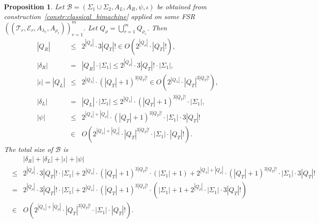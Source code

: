\documentclass{article}
\newtheorem{proposition}[definition]{Proposition}
\newcommand{\len}[1]{\ensuremath{\left| #1 \right|}}
\begin{document}
	\begin{proposition} \label{prop:size_classical_bimachine}
		Let $\mathcal{B} = (\Sigma_1\cup\Sigma_2, A_L, A_R, \psi, \iota)$ be obtained from construction~\ref{constr:classical_bimachine} applied on some FSR $((\mathcal{T}_r, \mathcal{E}_r, A_{\lambda_r}, A_{\rho_r}))_{r=1}^m$. Let $Q_\rho = \bigcup_{r=1}^m Q_{\rho_r}$. Then
		\begin{eqnarray*}
			\len{Q_R} &\le& 2^{\len{Q_\rho}}\cdot 3\len{Q_T}!\in O(2^{\len{Q_\rho}}\cdot \len{Q_T}!), \\
			\len{\delta_R} &=& \len{Q_R}\cdot \len{\Sigma_1} \le 2^{\len{Q_\rho}}\cdot 3\len{Q_T}!\cdot \len{\Sigma_1}, \\
			\len{\iota} = \len{Q_L} &\le& 2^{\len{Q_\lambda}}\cdot (\len{Q_T}+1)^{3\len{Q_T}!} \in O(2^{\len{Q_\lambda}}\cdot \len{Q_T}^{3\len{Q_T}!}), \\
			\len{\delta_L} &=& \len{Q_L}\cdot \len{\Sigma_1} \le 2^{\len{Q_\lambda}}\cdot (\len{Q_T}+1)^{3\len{Q_T}!}\cdot \len{\Sigma_1}, \\
			\len{\psi} &\le& 2^{\len{Q_\lambda}+\len{Q_\rho}}\cdot (\len{Q_T}+1)^{3\len{Q_T}!}\cdot \len{\Sigma_1}\cdot 3\len{Q_T}! \\
			&\in& O(2^{\len{Q_\lambda}+\len{Q_\rho}}\cdot \len{Q_T}^{3\len{Q_T}!}\cdot \len{\Sigma_1}\cdot \len{Q_T}!).
		\end{eqnarray*}
		The total size of $\mathcal{B}$ is
		\begin{eqnarray*}
			&&\len{\delta_R} + \len{\delta_L} + \len{\iota} + \len{\psi} \\
			&\le& 2^{\len{Q_\rho}}\cdot 3\len{Q_T}!\cdot \len{\Sigma_1} + 2^{\len{Q_\lambda}}\cdot (\len{Q_T}+1)^{3\len{Q_T}!}\cdot(\len{\Sigma_1}+1)
				+ 2^{\len{Q_\lambda}+\len{Q_\rho}}\cdot (\len{Q_T}+1)^{3\len{Q_T}!}\cdot \len{\Sigma_1}\cdot 3\len{Q_T}! \\
			&=& 2^{\len{Q_\rho}}\cdot 3\len{Q_T}!\cdot \len{\Sigma_1} + 2^{\len{Q_\lambda}}\cdot (\len{Q_T}+1)^{3\len{Q_T}!}\cdot (\len{\Sigma_1}+1+2^{\len{Q_\rho}}\cdot \len{\Sigma_1}\cdot 3\len{Q_T}!) \\
			&\in& O(2^{\len{Q_\lambda}+\len{Q_\rho}}\cdot \len{Q_T}^{3\len{Q_T}!}\cdot \len{\Sigma_1}\cdot \len{Q_T}!).
		\end{eqnarray*}
	\end{proposition}
\end{document}
